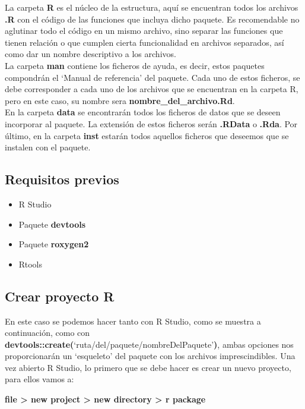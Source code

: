 La carpeta \textbf{R} es el n\'ucleo de la estructura, aqu\'i se encuentran todos los archivos \textbf{\textbf{.R}} con el c\'odigo de las funciones que incluya dicho paquete.
Es recomendable no aglutinar todo el c\'odigo en un mismo archivo, sino separar las funciones que tienen relaci\'on 
o que cumplen cierta funcionalidad en archivos separados, as\'i como dar un nombre descriptivo a los archivos.\\

La carpeta \textbf{man} contiene los ficheros de ayuda, es decir, estos paquetes compondr\'an el \enquote*{Manual de referencia} 
del paquete. Cada uno de estos ficheros, se debe corresponder a cada uno de los archivos que se encuentran 
en la carpeta R, pero en este caso, su nombre sera \textbf{nombre\_del\_archivo\textbf{.R}d}.\\

En la carpeta \textbf{data} se encontrar\'an todos los ficheros de datos que se deseen incorporar al paquete. La extensi\'on 
de estos ficheros ser\'an \textbf{\textbf{.R}Data} o \textbf{\textbf{.R}da}.
Por \'ultimo, en la carpeta \textbf{inst} estar\'an todos aquellos ficheros que deseemos que se instalen con el paquete.


\subsection{Requisitos previos}

\begin{itemize}
    \item R Studio
    \item Paquete \textbf{devtools}
    \item Paquete \textbf{\textbf{roxygen2}} 
    \item Rtools
\end{itemize}

\subsection{Crear proyecto R}

En este caso se podemos hacer tanto con R Studio, como se muestra a continuaci\'on,
como con \textbf{devtools::create(}\enquote*{ruta/del/paquete/nombreDelPaquete}\textbf{)}, ambas opciones nos
proporcionar\'an un \enquote*{esqueleto} del paquete con los archivos imprescindibles.
Una vez abierto R Studio, lo primero que se debe hacer es crear un nuevo proyecto, para
ellos vamos a: 
\begin{center}
    \textbf{file > new project > new directory > r package} 
\end{center}


